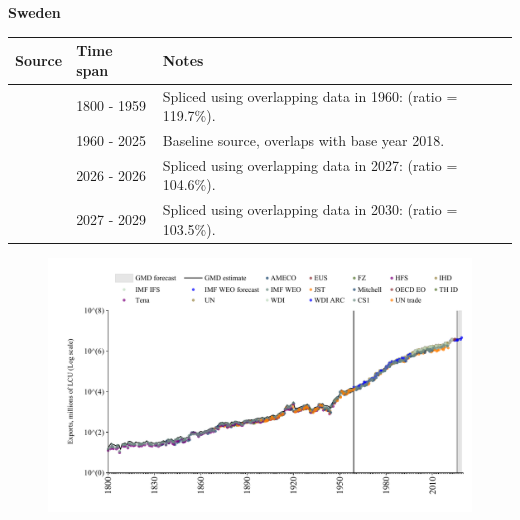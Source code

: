 \documentclass[12pt,a4paper,landscape]{article}
\begin{document}
\begin{adjustbox}{max totalsize={\paperwidth}{\paperheight},center}
\begin{minipage}[t][\textheight][t]{\textwidth}
\vspace*{0.5cm}
{}
\begin{center}
{\Large\bfseries Sweden}
\end{center}
\vspace{0.5cm}
\begin{table}[H]
\centering
\small
\begin{tabular}{|l|l|l|}
\hline
\textbf{Source} & \textbf{Time span} & \textbf{Notes} \\
\hline
\rowcolor{white}\cite{CS1_SWE}& 1800 - 1959 &Spliced using overlapping data in 1960: (ratio = 119.7\%).\\
\rowcolor{lightgray}\cite{OECD_EO}& 1960 - 2025 &Baseline source, overlaps with base year 2018.\\
\rowcolor{white}\cite{AMECO}& 2026 - 2026 &Spliced using overlapping data in 2027: (ratio = 104.6\%).\\
\rowcolor{lightgray}\cite{IMF_WEO_forecast}& 2027 - 2029 &Spliced using overlapping data in 2030: (ratio = 103.5\%).\\
\hline
\end{tabular}
\end{table}
\begin{figure}[H]
\centering
\includegraphics[width=\textwidth,height=0.6\textheight,keepaspectratio]{graphs/SWE_exports.pdf}
\end{figure}
\end{minipage}
\end{adjustbox}
\end{document}
